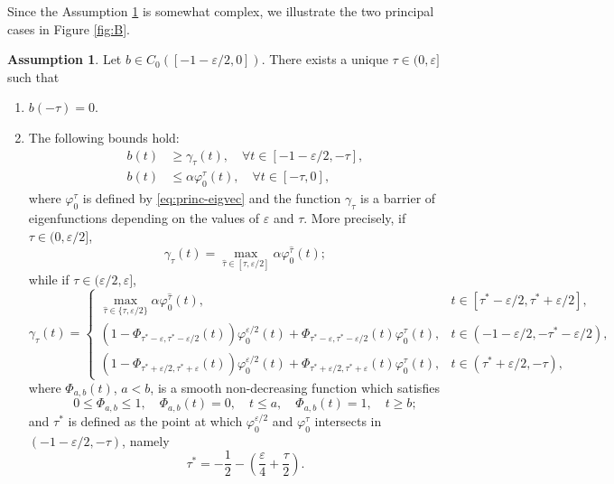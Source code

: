 \documentclass[a4paper,11pt]{article}
\theoremstyle{plain}
\theoremstyle{definition}
\newtheorem{assumption}{Assumption}[section]
\theoremstyle{definition}
\numberwithin{equation}{section}
\begin{document}
Since the Assumption \ref{as:Balpha} is somewhat complex, we illustrate the two principal cases in Figure \ref{fig:B}.
\begin{assumption}\label{as:Balpha}
Let $b\in C_0([-1-\varepsilon/2,0])$. There exists a unique $\tau\in (0,\varepsilon]$ such that
    \begin{enumerate}[label={\roman*)}]
    \item $b(-\tau)=0$.
    \item The following bounds hold:
    \begin{align*}
        b(t)&\geq \gamma_\tau(t), \quad\forall t\in[-1-\varepsilon/2,-\tau], \\
        b(t)&\leq \alpha \varphi_0^{\tau}(t), \quad \forall t\in[-\tau,0],
    \end{align*}
    where $\varphi_0^\tau$ is defined by \eqref{eq:princ-eigvec} and the function $\gamma_\tau$ is a barrier of eigenfunctions depending on the values of $\varepsilon$ and $\tau$. More precisely, if $\tau\in(0,\varepsilon/2]$,
    \[
        \gamma_\tau(t) = \max_{\hat{\tau}\in[\tau,\varepsilon/2]} \alpha \varphi_0^{\hat{\tau}}(t);
    \]
    while if $\tau\in(\varepsilon/2,\varepsilon]$,
    \[
        \gamma_\tau(t) = \begin{cases}
            \displaystyle \max_{\hat{\tau}\in\{\tau,\varepsilon/2\}} \alpha\varphi_0^{\hat{\tau}}(t), & t\in[\tau^*-\varepsilon/2, \tau^*+ \varepsilon/2], \\
            \displaystyle (1-\Phi_{\tau^*-\varepsilon,\tau^*-\varepsilon/2}(t)) \varphi_0^{\varepsilon/2}(t) + \Phi_{\tau^*-\varepsilon,\tau^*-\varepsilon/2}(t) \varphi_0^\tau(t), & t\in(-1-\varepsilon/2,-\tau^*-\varepsilon/2), \\
            \displaystyle (1- \Phi_{\tau^*+\varepsilon/2,\tau^*+ \varepsilon}(t) ) \varphi_0^{\varepsilon/2}(t) + \Phi_{\tau^*+\varepsilon/2,\tau^* +\varepsilon}(t) \varphi_0^\tau(t), & t\in(\tau^* + \varepsilon/2, -\tau),
        \end{cases}
    \]
    where $\Phi_{a,b}(t)$, $a<b$, is a smooth non-decreasing function which satisfies
    \[
        0\leq \Phi_{a,b} \leq 1, \quad \Phi_{a,b}(t)=0, \quad t\leq a, \quad \Phi_{a,b}(t) = 1, \quad t\geq b;
    \]
     and $\tau^*$ is defined as the point at which $\varphi_0^{\varepsilon/2}$ and $\varphi_0^\tau$ intersects in $(-1-\varepsilon/2,-\tau)$, namely
    \[
        \tau^* = -\frac{1}{2}-\left( \frac{\varepsilon}{4} + \frac{\tau}{2} \right).
    \]
    \end{enumerate}
\end{assumption}
\end{document}
